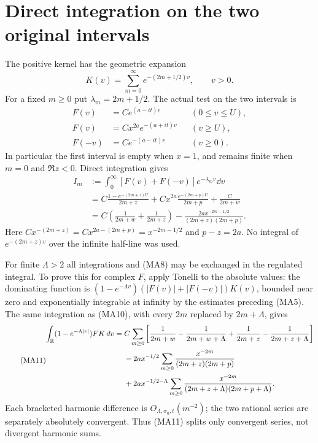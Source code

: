 \section{Direct integration on the two original intervals}
The positive kernel has the geometric expansion
\begin{equation}\tag{MA8}
 K(v)=\sum_{m=0}^\infty e^{-(2m+1/2)v},\qquad v>0.
\end{equation}
For a fixed $m\ge0$ put $\lambda_m=2m+1/2$. The actual test on the two
intervals is
\begin{equation}\tag{MA9}\begin{aligned}
 F(v)&=Ce^{(a-it)v}&& (0\le v\le U),\\
 F(v)&=Cx^{2a}e^{-(a+it)v}&& (v\ge U),\\
 F(-v)&=Ce^{-(a-it)v}&& (v\ge0).
\end{aligned}\end{equation}
In particular the first interval is empty when $x=1$, and remains finite
when $m=0$ and $\Re z<0$. Direct integration gives
\begin{equation}\tag{MA10}\begin{aligned}
 I_m&:=\int_0^\infty[F(v)+F(-v)]e^{-\lambda_m v}\dd v\\
 &=C\frac{1-e^{-(2m+z)U}}{2m+z}
   +Cx^{2a}\frac{e^{-(2m+p)U}}{2m+p}
   +\frac C{2m+w}\\
 &=C\left(\frac1{2m+w}+\frac1{2m+z}\right)
       -\frac{2a x^{-2m-1/2}}{(2m+z)(2m+p)}.
\end{aligned}\end{equation}
Here $Cx^{-(2m+z)}=Cx^{2a-(2m+p)}=x^{-2m-1/2}$ and $p-z=2a$.
No integral of $e^{-(2m+z)v}$ over the infinite half-line was used.

For finite $\Lambda>2$ all integrations and (MA8) may be exchanged in the
regulated integral. To prove this for complex $F$, apply Tonelli to the
absolute values: the dominating function is
$(1-e^{-\Lambda v})(|F(v)|+|F(-v)|)K(v)$, bounded near zero and
exponentially integrable at infinity by the estimates preceding (MA5).
The same integration as (MA10), with every $2m$ replaced by $2m+\Lambda$,
gives
\begin{equation}\tag{MA11}\begin{aligned}
 \int_\mathbb R(1-e^{-\Lambda|v|})FK\,d v
 ={}&C\sum_{m\ge0}\left[
 \frac1{2m+w}-\frac1{2m+w+\Lambda}
 +\frac1{2m+z}-\frac1{2m+z+\Lambda}\right]\\
 &-2a x^{-1/2}\sum_{m\ge0}
 \frac{x^{-2m}}{(2m+z)(2m+p)}\\
 &+2a x^{-1/2-\Lambda}\sum_{m\ge0}
 \frac{x^{-2m}}{(2m+z+\Lambda)(2m+p+\Lambda)}.
\end{aligned}\end{equation}
Each bracketed harmonic difference is $O_{\Lambda,\sigma_0,t}(m^{-2})$;
the two rational series are separately absolutely convergent. Thus (MA11)
splits only convergent series, not divergent harmonic sums.

